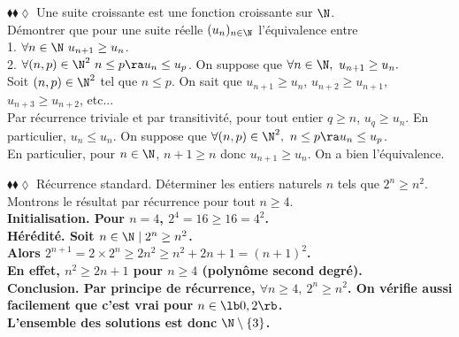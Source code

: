 \documentclass[11pt]{article}
\begin{document}
\begin{exercice}{$\blacklozenge\blacklozenge\lozenge$}{}
    Une suite croissante est une fonction croissante sur $\N$.\\
    Démontrer que pour une suite réelle $(u_n)_{n\in\N}$ l'équivalence entre\\
    1. $\forall n \in \N ~ u_{n+1} \geq u_n$.\\
    2. $\forall (n,p) \in \N^2 ~ n \leq p \ra u_n \leq u_p$.
    \tcblower
    \fbox{$\ra$} On suppose que $\forall n \in \N, ~ u_{n+1} \geq u_n.$\\
    Soit $(n,p) \in \N^2$ tel que $n \leq p$. On sait que $u_{n+1} \geq u_n$, $u_{n+2} \geq u_{n+1}$, $u_{n+3} \geq u_{n+2}$, etc...\\
    Par récurrence triviale et par transitivité, pour tout entier $q\geq n$, $u_q \geq u_n$. En particulier, $u_n \leq u_n$.\n
    \fbox{$\la$} On suppose que $\forall (n,p) \in \N^2, ~ n \leq p \ra u_n \leq u_p$.\\
    En particulier, pour $n\in \N$, $n+1 \geq n$ donc $u_{n+1} \geq u_n$.\n
    On a bien l'équivalence. 
\end{exercice}

\begin{exercice}{$\blacklozenge\blacklozenge\lozenge$ Récurrence standard.}{}
    Déterminer les entiers naturels $n$ tels que $2^n\geq n^2$.
    \tcblower
    Montrons le résultat par récurrence pour tout $n\geq4$.\\
    \bf{Initialisation.} Pour $n=4$, $2^4=16\geq16=4^2$.\\
    \bf{Hérédité.} Soit $n\in\N \mid 2^n\geq n^2$.\\
    Alors $2^{n+1}=2\times2^n\geq2n^2\geq n^2 + 2n + 1 = (n+1)^2$.\\
    En effet, $n^2\geq2n+1$ pour $n\geq4$ (polynôme second degré).\\
    \bf{Conclusion.} Par principe de récurrence, $\forall n\geq4,~ 2^n\geq n^2$.\n
    On vérifie aussi facilement que c'est vrai pour $n\in\lb0,2\rb$.\\
    L'ensemble des solutions est donc $\N\setminus\{3\}$.
\end{exercice}
\end{document}
